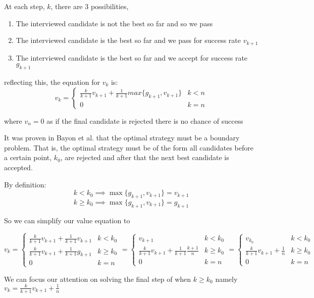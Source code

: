 \documentclass[a4paper,11pt]{article}
\begin{document}
At each step, $k$, there are 3 possibilities, 
\begin{enumerate}
\item The interviewed candidate is not the best so far and so we pass
\item The interviewed candidate is the best so far and we pass for success rate $v_{k+1}$
\item The interviewed candidate is the best so far and we accept for success rate $g_{k+1}$
\end{enumerate}

reflecting this, the equation for $v_k$ is:
$$
v_k = 
\begin{cases}
   \frac{k}{k+1}v_{k+1} + \frac{1}{k+1}max\{g_{k+1}, v_{k+1}\} &  k < n \\
   0& k = n
\end{cases}
$$

where $v_n = 0 $ as if the final candidate is rejected there is no chance of success

It was proven in Bayon et al. \cite{bayon2017bestorworstpostdocproblems} that the optimal strategy must be a boundary problem. That is, the optimal strategy must be of the form all candidates before a certain point, $k_0$, are rejected and after that the next best candidate is accepted. 

By definition:
$$
k < k_0 \implies \max\{g_{k+1}, v_{k+1}\} = v_{k+1}
$$
$$
k \ge k_0 \implies \max\{g_{k+1}, v_{k+1}\} = g_{k+1}
$$

So we can simplify our value equation to 

$$
v_k = 
\begin{cases}
   \frac{k}{k+1}v_{k+1} + \frac{1}{k+1}v_{k+1} &  k < k_0 \\
  \frac{k}{k+1}v_{k+1} + \frac{1}{k+1} g_{k+1} &  k \ge k_0 \\
   0& k = n
\end{cases}
=
\begin{cases}
   v_{k+1} &  k < k_0 \\
  \frac{k}{k+1}v_{k+1} + \frac{1}{k+1} \frac{k+1}{n} &  k \ge k_0 \\
   0& k = n
\end{cases}
= 
\begin{cases}
   v_{k_0} &  k < k_0 \\
  \frac{k}{k+1}v_{k+1} + \frac{1}{n} &  k \ge k_0 \\
   0& k = n
\end{cases}
$$

We can focus our attention on solving the final step of when $k \ge k_0$ namely $v_k = \frac{k}{k+1}v_{k+1} + \frac{1}{n}$
\end{document}
